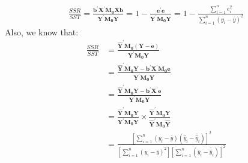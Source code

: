 \documentclass{article}
\begin{document}
	\begin{align*}
		\frac{SSR}{SST} = \frac{\boldsymbol{b}^\prime \boldsymbol{X}^\prime \boldsymbol{M_0} \boldsymbol{X} \boldsymbol{b}}{\boldsymbol{Y}^\prime \boldsymbol{M_0} \boldsymbol{Y}} = 1 - \frac{\boldsymbol{e}^\prime \boldsymbol{e}}{\boldsymbol{Y}^\prime \boldsymbol{M_0} \boldsymbol{Y}} = 1 - \frac{\sum^n_{i=1} e^2_i}{\sum^n_{i=1} (y_i - \bar{y})^2}
	\end{align*}
Also, we know that:
	\begin{align*}
		\frac{SSR}{SST} &= \frac{\hat{\boldsymbol{Y}}^\prime \boldsymbol{M_0} (\boldsymbol{Y} - \boldsymbol{e})}{\boldsymbol{Y}^\prime \boldsymbol{M_0} \boldsymbol{Y}}\\
		&= \frac{\hat{\boldsymbol{Y}}^\prime \boldsymbol{M_0} \boldsymbol{Y} - \boldsymbol{b}^\prime \boldsymbol{X}^\prime \boldsymbol{M_0} \boldsymbol{e}}{\boldsymbol{Y}^\prime \boldsymbol{M_0} \boldsymbol{Y}}\\
		&= \frac{\hat{\boldsymbol{Y}}^\prime \boldsymbol{M_0} \boldsymbol{Y} - \boldsymbol{b}^\prime \boldsymbol{X}^\prime \boldsymbol{e}}{\boldsymbol{Y}^\prime \boldsymbol{M_0} \boldsymbol{Y}}\\
		&= \frac{\hat{\boldsymbol{Y}}^\prime \boldsymbol{M_0} \boldsymbol{Y}}{\boldsymbol{Y}^\prime \boldsymbol{M_0} \boldsymbol{Y}} \times \frac{\hat{\boldsymbol{Y}}^\prime \boldsymbol{M_0} \boldsymbol{Y}}{\hat{\boldsymbol{Y}}^\prime \boldsymbol{M_0} \hat{\boldsymbol{Y}}}\\
		&= \frac{[\sum^n_{i=1} (y_i - \bar{y})(\hat{y}_i - \bar{\hat{y}}_i)]^2}{[\sum^n_{i=1} (y_i - \bar{y})^2] [\sum^n_{i=1} (\hat{y}_i - \bar{\hat{y}}_i)]^2}
	\end{align*}
\end{document}
